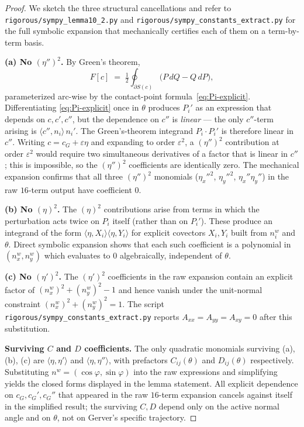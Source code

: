 \documentclass[11pt]{amsart}
\theoremstyle{plain}
\theoremstyle{definition}
\begin{document}
\begin{proof}
We sketch the three structural cancellations and refer to
\texttt{rigorous/sympy\_lemma10\_2.py} and
\texttt{rigorous/sympy\_constants\_extract.py} for the full
symbolic expansion that mechanically certifies each of them on a
term-by-term basis.

\textbf{(a) No $(\eta'')^{2}$.}  By Green's theorem,
\[
   F[c] \;=\; \tfrac{1}{2}\oint_{\partial S(c)}
              \bigl(P\,dQ - Q\,dP\bigr),
\]
parameterized arc-wise by the contact-point
formula~\eqref{eq:Pi-explicit}.  Differentiating
\eqref{eq:Pi-explicit} once in $\theta$ produces $P_{i}'$ as an
expression that depends on $c, c', c''$, but the dependence on
$c''$ is \emph{linear} --- the only $c''$-term arising is
$\langle c'', n_{i}\rangle\, n_{i}'$.  The Green's-theorem
integrand $P_{i}\cdot P_{i}'$ is therefore linear in $c''$.
Writing $c = c_{G} + \varepsilon\eta$ and expanding to order
$\varepsilon^{2}$, a $(\eta'')^{2}$ contribution at order
$\varepsilon^{2}$ would require two simultaneous derivatives of a
factor that is linear in $c''$; this is impossible, so the
$(\eta'')^{2}$ coefficients are identically zero.  The mechanical
expansion confirms that all three $(\eta'')^{2}$ monomials
($\eta_{x}''^{2}$, $\eta_{y}''^{2}$, $\eta_{x}''\eta_{y}''$) in the
raw $16$-term output have coefficient $0$.

\textbf{(b) No $(\eta)^{2}$.}  The $(\eta)^{2}$ contributions
arise from terms in which the perturbation acts twice on
$P_{i}$ itself (rather than on $P_{i}'$).  These produce an
integrand of the form $\langle \eta, X_{i}\rangle\langle \eta,
Y_{i}\rangle$ for explicit covectors $X_{i}, Y_{i}$ built from
$n_{i}^{w}$ and $\theta$.  Direct symbolic expansion shows that
each such coefficient is a polynomial in $(n_{x}^{w},
n_{y}^{w})$ which evaluates to $0$ algebraically, independent of
$\theta$.

\textbf{(c) No $(\eta')^{2}$.}  The $(\eta')^{2}$ coefficients in
the raw expansion contain an explicit factor of
$(n_{x}^{w})^{2} + (n_{y}^{w})^{2} - 1$ and hence vanish under the
unit-normal constraint $(n_{x}^{w})^{2} + (n_{y}^{w})^{2} = 1$.
The script
\texttt{rigorous/sympy\_constants\_extract.py} reports
$A_{xx} = A_{yy} = A_{xy} = 0$ after this substitution.

\textbf{Surviving $C$ and $D$ coefficients.}  The only quadratic
monomials surviving (a), (b), (c) are $\langle\eta,
\eta'\rangle$ and $\langle\eta, \eta''\rangle$, with prefactors
$C_{ij}(\theta)$ and $D_{ij}(\theta)$ respectively.  Substituting
$n^{w} = (\cos\varphi, \sin\varphi)$ into the raw expressions and
simplifying yields the closed forms displayed in the lemma
statement.  All explicit dependence on $c_{G}, c_{G}', c_{G}''$
that appeared in the raw $16$-term expansion cancels against
itself in the simplified result; the surviving $C, D$ depend only
on the active normal angle and on $\theta$, not on Gerver's
specific trajectory.
\end{proof}
\end{document}
